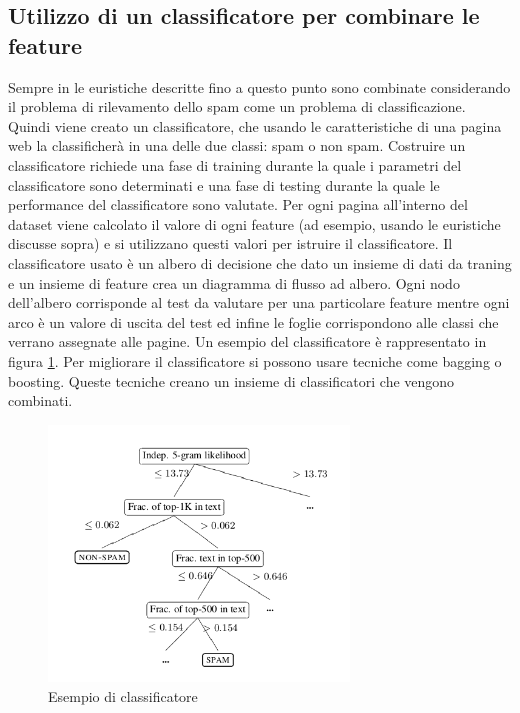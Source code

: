 \subsection{Utilizzo di un classificatore per combinare le feature}
Sempre in \cite{Ntoulas:2006:DSW:1135777.1135794} le euristiche descritte fino a questo punto sono combinate considerando il problema di rilevamento dello spam come un problema di classificazione. Quindi  viene creato un classificatore, che usando le caratteristiche di una  pagina web la classificherà in una delle due classi: spam o non spam. Costruire un classificatore richiede una fase di training durante la quale i parametri del classificatore sono determinati e una fase di testing durante la quale le performance del classificatore sono valutate. Per ogni pagina all'interno del dataset viene calcolato il valore di ogni feature (ad esempio, usando le euristiche discusse sopra) e si utilizzano questi valori per istruire il classificatore. Il classificatore usato è un albero di decisione che dato un insieme di dati da traning e un insieme di feature crea un diagramma di flusso ad albero. Ogni nodo dell'albero corrisponde al test da valutare per una particolare feature mentre ogni arco è un valore di uscita del test 
ed 
infine le foglie corrispondono alle classi che verrano assegnate alle pagine. Un esempio del classificatore è rappresentato in figura \ref{fig:fetterly13}. Per migliorare il classificatore si possono usare tecniche come bagging o boosting. Queste tecniche creano un insieme di classificatori  che vengono combinati.
\begin{figure}[htbp]
\centering
\includegraphics[width=8cm]{immagini/fetterly/fetterly13}
\caption{Esempio di classificatore}
\label{fig:fetterly13}
\end{figure}

